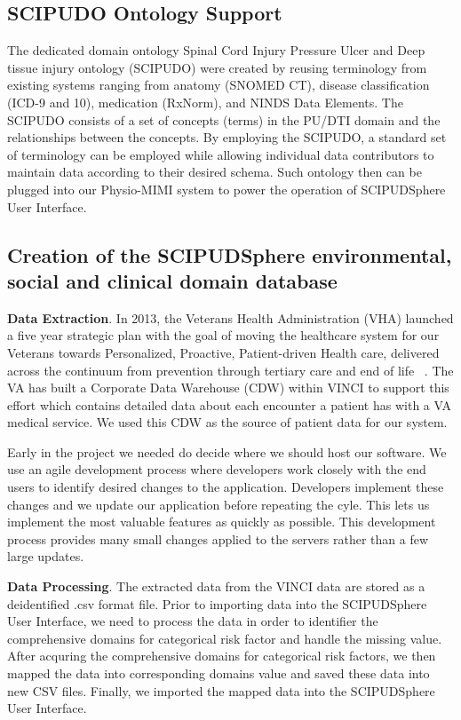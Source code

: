 \documentclass{amia}
\begin{document}

\subsection{SCIPUDO Ontology Support}
The dedicated domain ontology Spinal Cord Injury Pressure Ulcer and Deep tissue injury ontology (SCIPUDO) were created by reusing terminology from existing systems ranging from anatomy (SNOMED CT), disease classification (ICD-9 and 10), medication (RxNorm), and NINDS Data Elements. The SCIPUDO consists of a set of concepts (terms) in the PU/DTI domain and the relationships between the concepts. By employing the SCIPUDO, a standard set of terminology can be employed while allowing individual data contributors to maintain data according to their desired schema. Such ontology then can be plugged into our Physio-MIMI system to power the operation of SCIPUDSphere User Interface.

\subsection{Creation of the SCIPUDSphere environmental, social and clinical domain database}

{\bf Data Extraction}. In 2013, the Veterans Health Administration (VHA) launched a five year strategic plan with the goal of moving the healthcare system for our Veterans towards Personalized, Proactive, Patient-driven Health care, delivered across the continuum from prevention through tertiary care and end of life ~\cite{vha_plan}. The VA has built a Corporate Data Warehouse (CDW) within VINCI to support this effort which contains detailed data about each encounter a patient has with a VA medical service.  We used this CDW as the source of patient data for our system. 

Early in the project we needed do decide where we should host our software. We use an agile development process where developers work closely with the end users to identify desired changes to the application. Developers implement these changes and we update our application before repeating the cyle. This lets us implement the most valuable features as quickly as possible. This development process provides many small changes applied to the servers rather than a few large updates.

{\bf Data Processing}. The extracted data from the VINCI data are stored as a deidentified .csv format file. Prior to importing data into the SCIPUDSphere User Interface, we need to process the data in order to identifier the comprehensive domains for categorical risk factor and handle the missing value. After acquring the comprehensive domains for categorical risk factors, we then mapped the data into corresponding domains value and saved these data into new CSV files. Finally, we imported the mapped data into the SCIPUDSphere User Interface.
\end{document}
